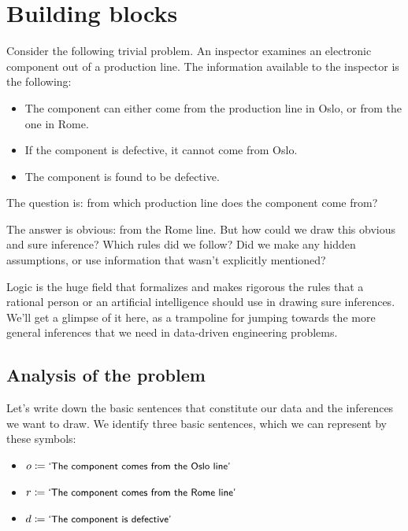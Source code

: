 \documentclass[
  a4paper,
  DIV=11,
  numbers=noendperiod,
  oneside]{scrreprt}
\begin{document}
\hypertarget{building-blocks}{%
\section{Building blocks}\label{building-blocks}}

Consider the following trivial problem. An inspector examines an
electronic component out of a production line. The information available
to the inspector is the following:

\begin{itemize}
\item
  The component can either come from the production line in Oslo, or
  from the one in Rome.
\item
  If the component is defective, it cannot come from Oslo.
\item
  The component is found to be defective.
\end{itemize}

The question is: from which production line does the component come
from?

The answer is obvious: from the Rome line. But how could we draw this
obvious and sure inference? Which rules did we follow? Did we make any
hidden assumptions, or use information that wasn't explicitly mentioned?

Logic is the huge field that formalizes and makes rigorous the rules
that a rational person or an artificial intelligence should use in
drawing sure inferences. We'll get a glimpse of it here, as a trampoline
for jumping towards the more general inferences that we need in
data-driven engineering problems.

\hypertarget{analysis-of-the-problem}{%
\subsection{Analysis of the problem}\label{analysis-of-the-problem}}

Let's write down the basic sentences that constitute our data and the
inferences we want to draw. We identify three basic sentences, which we
can represent by these symbols:

\begin{itemize}
\item
  \(o \coloneqq \textsf{\small`The component comes from the Oslo line'}\)
\item
  \(r \coloneqq \textsf{\small`The component comes from the Rome line'}\)
\item
  \(d \coloneqq \textsf{\small`The component is defective'}\)
\end{itemize}
\end{document}
